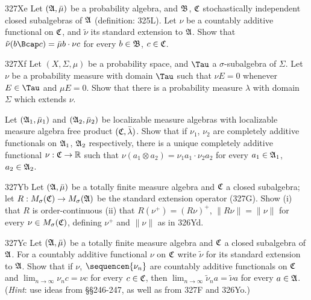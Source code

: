 {

\spheader 327Xe Let $(\frak A,\bar\mu)$ be a probability algebra, and
$\frak B$, $\frak C$ stochastically independent closed subalgebras of
$\frak A$ (definition: 325L).   Let $\nu$ be a countably additive
functional on $\frak C$, and $\tilde\nu$ its standard extension to
$\frak A$.   Show that $\tilde\nu(b\Bcap c)=\bar\mu b\cdot\nu c$ for
every $b\in\frak B$, $c\in\frak C$.

\spheader 327Xf Let $(X,\Sigma,\mu)$ be a probability space, and $\Tau$
a $\sigma$-subalgebra of $\Sigma$.   Let $\nu$ be a probability measure
with domain $\Tau$ such that $\nu E=0$ whenever $E\in\Tau$ and
$\mu E=0$.   Show that there is a probability measure $\lambda$ with
domain $\Sigma$ which extends $\nu$.

Let $(\frak A_1,\bar\mu_1)$ and $(\frak A_2,\bar\mu_2)$ be localizable
measure algebras with localizable measure algebra free product
$(\frak C,\bar\lambda)$.   Show that if $\nu_1$, $\nu_2$ are completely
additive
functionals on $\frak A_1$, $\frak A_2$ respectively, there is a unique
completely additive functional $\nu:\frak C\to\Bbb R$ such that
$\nu(a_1\otimes a_2)=\nu_1a_1\cdot\nu_2a_2$ for every $a_1\in\frak A_1$,
$a_2\in\frak A_2$.   

\spheader 327Yb Let $(\frak A,\bar\mu)$ be a totally finite measure
algebra and $\frak C$ a closed subalgebra;  let
$R:M_{\sigma}(\frak C)\to M_{\sigma}(\frak A)$ be the standard extension
operator (327G).
Show (i) that $R$ is order-continuous (ii) that $R(\nu^+)=(R\nu)^+$,
$\|R\nu\|=\|\nu\|$ for every $\nu\in M_{\sigma}(\frak C)$, defining
$\nu^+$ and $\|\nu\|$ as in 326Yd.

\spheader 327Yc Let $(\frak A,\bar\mu)$ be a totally finite measure
algebra and $\frak C$ a closed subalgebra of $\frak A$.   For a
countably additive functional $\nu$ on $\frak C$ write $\tilde\nu$ for
its standard extension to $\frak A$.   Show that if $\nu$,
$\sequencen{\nu_n}$ are countably additive functionals on $\frak C$ and
$\lim_{n\to\infty}\nu_nc=\nu c$ for every $c\in\frak C$, then
$\lim_{n\to\infty}\tilde\nu_na=\tilde\nu a$ for every $a\in\frak A$.
({\it Hint\/}:  use ideas from \S\S246-247, as well as from 327F and
326Yo.)
}%

